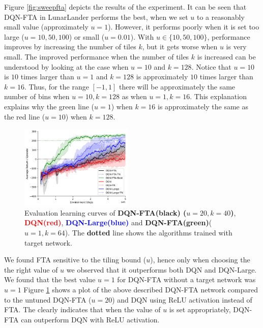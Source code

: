 \documentclass{article}
\begin{document}
Figure \ref{fig:sweepfta} depicts the results of the experiment.
It can be seen that DQN-FTA in LunarLander performs the best, when we set $u$ to a reasonably small value (approximately $u = 1$).
However, it performs poorly when it is set too large ($u=10, 50, 100$) or small ($u=0.01$).
With $u \in \{10, 50, 100\}$, performance improves by increasing the number of tiles $k$, but it gets worse when $u$ is very small.
The improved performance when the number of tiles $k$ is increased can be understood by looking at the case when $u=10$ and $k=128$.
Notice that $u=10$ is $10$ times larger than $u=1$ and $k=128$ is approximately $10$ times larger than $k=16$.
Thus, for the range $[-1, 1]$ there will be approximately the same number of bins when $u=10, k=128$ as when $u=1, k=16$.
This explanation explains why the green line ($u=1$) when $k=16$ is approximately the same as the red line ($u=10$) when $k=128$.

\begin{figure}[h]
    \centering
    \includegraphics[height=4cm]{bestfta.png}
    \caption{Evaluation learning curves of {\bf DQN-FTA(black) ($u=20, k = 40$)}, {\textcolor{red} {\bf DQN(red)}},  {\textcolor{blue} {\bf DQN-Large(blue)}} and {\textcolor{mygreen} {\bf DQN-FTA(green)}($u=1, k=64$)}. The {\bf dotted} line shows the algorithms trained with target network.}
    \label{fig:bestfta}
\end{figure}

We found FTA sensitive to the tiling bound ($u$), hence only when choosing the the right value of $u$ we observed that it outperforms both DQN and DQN-Large.
We found that the best value $u=1$ for DQN-FTA without a target network was $u=1$
Figure \ref{fig:bestfta} shows a plot of the above described DQN-FTA network compared to the untuned DQN-FTA ($u=20$) and DQN using ReLU activation instead of FTA.
The clearly indicates that when the value of $u$ is set appropriately, DQN-FTA can outperform DQN with ReLU activation.
\end{document}
